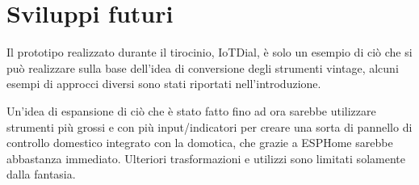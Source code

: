 \documentclass[12pt,a4paper]{report}
\begin{document}
\section{Sviluppi futuri}
Il prototipo realizzato durante il tirocinio, IoTDial, è solo un esempio di ciò che si può realizzare sulla base dell'idea di conversione degli
strumenti vintage, alcuni esempi di approcci diversi sono stati riportati nell'introduzione.

Un'idea di espansione di ciò che è stato fatto fino ad ora sarebbe utilizzare strumenti più grossi e con più input/indicatori per creare
una sorta di pannello di controllo domestico integrato con la domotica, che grazie a ESPHome sarebbe abbastanza immediato.
Ulteriori trasformazioni e utilizzi sono limitati solamente dalla fantasia.




\end{document}
